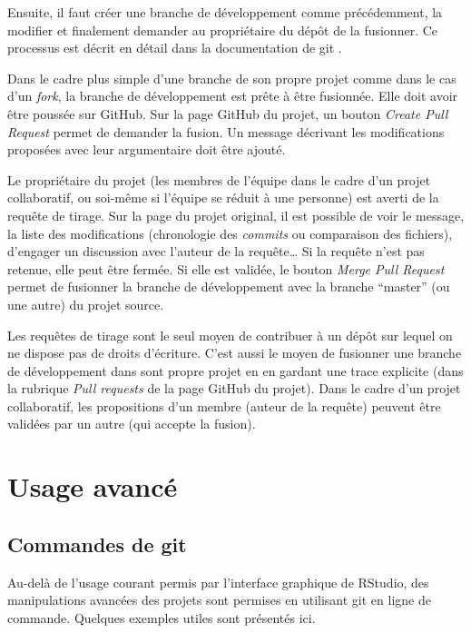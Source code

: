 \documentclass[
  12pt,
  french,
  a4paper,
  extrafontsizes,onecolumn,openright
  ]{memoir}
\newlength{\rf}
\begin{document}
Ensuite, il faut créer une branche de développement comme précédemment, la modifier et finalement demander au propriétaire du dépôt de la fusionner.
Ce processus est décrit en détail dans la documentation de git .

Dans le cadre plus simple d'une branche de son propre projet comme dans le cas d'un \emph{fork}, la branche de développement est prête à être fusionnée.
Elle doit avoir être poussée sur GitHub.
Sur la page GitHub du projet, un bouton \emph{Create Pull Request} permet de demander la fusion.
Un message décrivant les modifications proposées avec leur argumentaire doit être ajouté.

Le propriétaire du projet (les membres de l'équipe dans le cadre d'un projet collaboratif, ou soi-même si l'équipe se réduit à une personne) est averti de la requête de tirage.
Sur la page du projet original, il est possible de voir le message, la liste des modifications (chronologie des \emph{commits} ou comparaison des fichiers), d'engager un discussion avec l'auteur de la requête\ldots{}
Si la requête n'est pas retenue, elle peut être fermée.
Si elle est validée, le bouton \emph{Merge Pull Request} permet de fusionner la branche de développement avec la branche \enquote{master} (ou une autre) du projet source.

Les requêtes de tirage sont le seul moyen de contribuer à un dépôt sur lequel on ne dispose pas de droits d'écriture.
C'est aussi le moyen de fusionner une branche de développement dans sont propre projet en en gardant une trace explicite (dans la rubrique \emph{Pull requests} de la page GitHub du projet).
Dans le cadre d'un projet collaboratif, les propositions d'un membre (auteur de la requête) peuvent être validées par un autre (qui accepte la fusion).

\hypertarget{usage-avancuxe9}{%
\section{Usage avancé}\label{usage-avancuxe9}}

\hypertarget{commandes-de-git}{%
\subsection{Commandes de git}\label{commandes-de-git}}

Au-delà de l'usage courant permis par l'interface graphique de RStudio, des manipulations avancées des projets sont permises en utilisant git en ligne de commande.
Quelques exemples utiles sont présentés ici.
\end{document}
